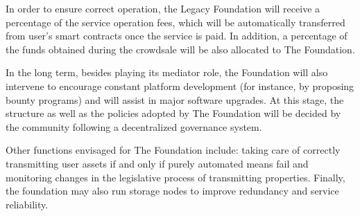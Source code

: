 In order to ensure correct operation, the Legacy Foundation will receive a percentage of the service operation fees, which will be automatically transferred from user’s smart contracts once the service is paid. In addition, a percentage of the funds obtained during the crowdsale will be also allocated to The Foundation.

In the long term, besides playing its mediator role, the Foundation will also intervene to encourage constant platform development (for instance, by proposing bounty programs) and will assist in major software upgrades.
At this stage, the structure as well as the policies adopted by The Foundation will be decided by the community following a decentralized governance system.

Other functions envisaged for The Foundation include: taking care of correctly transmitting user assets if and only if purely automated means fail and monitoring changes in the legislative process of transmitting properties.
Finally, the foundation may also run storage nodes to improve redundancy and service reliability.


